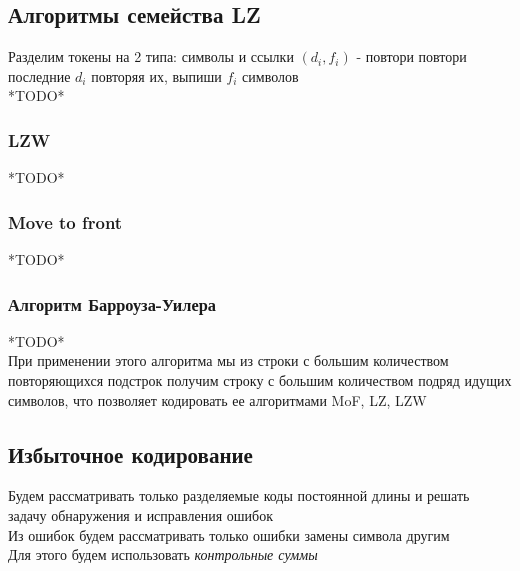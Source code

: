 \documentclass[12pt]{article}
\begin{document}
\subsection{Алгоритмы семейства LZ}
Разделим токены на 2 типа: символы и ссылки $(d_i, f_i)$ - повтори повтори последние $d_i$ повторяя их, выпиши $f_i$ символов\\
*TODO*
\subsubsection{LZW}
*TODO*
\subsubsection{Move to front}
*TODO*
\subsubsection{Алгоритм Барроуза-Уилера}
*TODO*\\
При применении этого алгоритма мы из строки с большим количеством повторяющихся подстрок получим строку с большим количеством подряд идущих символов, что позволяет кодировать ее алгоритмами MoF, LZ, LZW
\subsection{Избыточное кодирование}
Будем рассматривать только разделяемые коды постоянной длины и решать задачу обнаружения и исправления ошибок\\
Из ошибок будем рассматривать только ошибки замены символа другим\\
Для этого будем использовать \textit{контрольные суммы}
\end{document}
